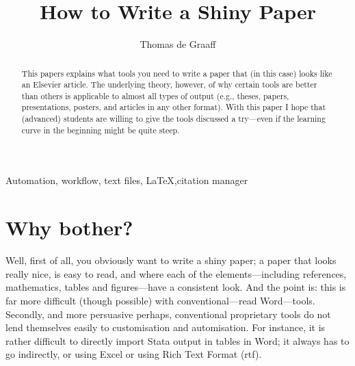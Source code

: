 \documentclass[preprint,authoryear,5p]{elsarticle}
\begin{document}
\begin{frontmatter}
	
	\title{How to Write a Shiny Paper}  
	\author{Thomas de Graaff}   \address{Department of Spatial Economics, Vrije Universiteit}
	\begin{abstract}
		This papers explains what tools you need to write a paper that (in this case) looks like an Elsevier article. The underlying theory, however, of why certain tools are better than others is applicable to almost all types of output (e.g., theses, papers, presentations, posters, and articles in any other format). With this paper I hope that (advanced) students are willing to give the tools discussed a try---even if the learning curve in the beginning might be quite steep. 
	\end{abstract}
	\begin{keyword}
		Automation, workflow, text files, \LaTeX \sep citation manager 
	\end{keyword}
\end{frontmatter}

\section{Why bother?} Well, first of all, you obviously want to write a shiny paper; a paper that looks really nice, is easy to read, and where each of the elements---including references, mathematics, tables and figures---have a consistent look. And the point is: this is far more difficult (though possible) with conventional---read Word---tools. Secondly, and more persuasive perhaps, conventional proprietary tools do not lend themselves easily to customisation and automisation. For instance, it is rather difficult to directly import Stata output in tables in Word; it always has to go indirectly, or using Excel or using Rich Text Format (rtf). 
\end{document}
